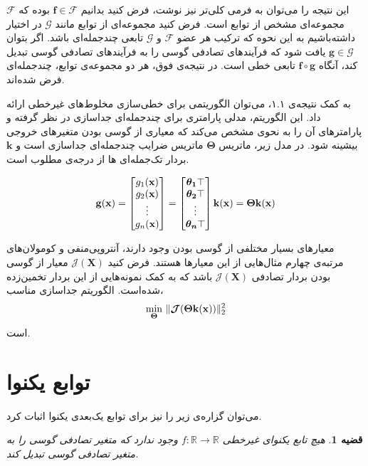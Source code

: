 \documentclass{article}
\newtheorem{thm}{{\large\bf قضیه}}[section]
\begin{document}
این نتیجه را می‌توان به فرمی کلی‌تر نیز نوشت، فرض کنید بدانیم 
$\mathbf{f} \in \mathcal{F}$
بوده که 
$\mathcal{F}$
مجموعه‌ای مشخص از توابع است. فرض کنید  مجموعه‌ای از توابع مانند 
$\mathcal{G}$
در اختیار داشته‌باشیم به این نحوه  که ترکیب هر عضو 
$\mathcal{F}$
و
$\mathcal{G}$
تابعی چند‌جمله‌ای باشد. اگر بتوان
$\mathbf{g} \in \mathcal{G}$
یافت شود که فرآيند‌های تصادفی گوسی را به فرآیند‌های تصادفی گوسی تبدیل کند، آنگاه
$\mathbf{f} \circ \mathbf{g}$
تابعی خطی است. در نتیجه‌ی فوق، هر دو مجموعه‌ی توابع، چندجمله‌ای فرض‌ شده‌اند.


به کمک نتیجه‌ی ۱.۱، می‌توان الگوریتمی برای خطی‌سازی مخلوط‌های غیرخطی ارائه داد. این الگوریتم، مدلی پارامتری برای چندجمله‌ای جداسازی در نظر گرفته و پارامترهای آن را به نحوی مشخص می‌کند که معیاری از گوسی بودن متغیر‌های خروجی بیشینه شود. در مدل زیر، ماتریس 
$\boldsymbol{\Theta}$
ماتریس ضرایب چند‌جمله‌ای جداسازی است و 
$\mathbf{k}$
بردار تک‌جمله‌ای ها از درجه‌ی مطلوب است.

\begin{equation*}
\label{E_Parametrizing}
{\bf g}({\bf x})=
\begin{bmatrix}
g_1({\bf x}) \\
g_2({\bf x}) \\
\vdots \\
g_n({\bf x})
\end{bmatrix}=
\begin{bmatrix}
\boldsymbol{\theta_1}\top \\
\boldsymbol{\theta_2}\top\\
\vdots \\
\boldsymbol{\theta_n}\top
\end{bmatrix}{\bf k}({\bf x})=
\boldsymbol{\Theta}{\bf k}({\bf x})
\end{equation*}

معیارهای بسیار مختلفی از گوسی بودن وجود دارند، آنتروپی‌منفی و کومولان‌های مرتبه‌ی چهارم مثال‌هایی از این معیار‌ها هستند. فرض کنید 
$\mathcal{J}(\mathbf{X})$
معیار از گوسی بودن بردار تصادفی 
$\mathcal{J}(\mathbf{X})$
باشد که به کمک نمونه‌هایی از این بردار تخمین‌زده شده‌است. الگوریتم جداسازی مناسب، 
\begin{equation*}
\underset{\boldsymbol{\Theta}}{\min} \ \| \boldsymbol{\mathcal{J}}(\boldsymbol{\Theta}{\bf k}({\bf x})) \|_2^2
\end{equation*}
است.
\section{توابع یکنوا}

می‌توان گزاره‌ی زیر را نیز برای توابع یک‌بعدی یکنوا اثبات کرد.
\begin{thm}
هیچ تابع یکنوای غیرخطی
$f: \mathbb{R} \to \mathbb{R}$
وجود ندارد که متغیر تصادفی‌ گوسی را به متغیر تصادفی گوسی تبدیل کند.
\end{thm}
\end{document}
